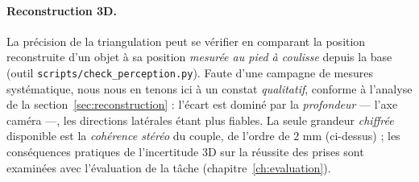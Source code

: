 \paragraph{Reconstruction 3D.} La précision de la triangulation peut se vérifier en comparant la position reconstruite d'un objet à sa position \emph{mesurée au pied à coulisse} depuis la base (outil \texttt{scripts/check\_perception.py}). Faute d'une campagne de mesures systématique, nous nous en tenons ici à un constat \emph{qualitatif}, conforme à l'analyse de la section~\ref{sec:reconstruction} : l'écart est dominé par la \emph{profondeur} --- l'axe caméra ---, les directions latérales étant plus fiables. La seule grandeur \emph{chiffrée} disponible est la \emph{cohérence stéréo} du couple, de l'ordre de $2$ mm (ci-dessus) ; les conséquences pratiques de l'incertitude 3D sur la réussite des prises sont examinées avec l'évaluation de la tâche (chapitre~\ref{ch:evaluation}).
